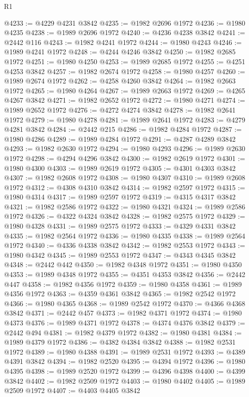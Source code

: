 \begin{lexlean}{R1}
\begin{coremodule}
@4233 := @4229 @4231 @3842
@4235 := @1982 @2696 @1972
@4236 := @1980 @4235
@4238 := @1989 @2696 @1972
@4240 := @4236 @4238 @3842
@4241 := @2442 @116
@4243 := @1982 @4241 @1972
@4244 := @1980 @4243
@4246 := @1989 @4241 @1972
@4248 := @4244 @4246 @3842
@4250 := @1982 @2685 @1972
@4251 := @1980 @4250
@4253 := @1989 @2685 @1972
@4255 := @4251 @4253 @3842
@4257 := @1982 @2674 @1972
@4258 := @1980 @4257
@4260 := @1989 @2674 @1972
@4262 := @4258 @4260 @3842
@4264 := @1982 @2663 @1972
@4265 := @1980 @4264
@4267 := @1989 @2663 @1972
@4269 := @4265 @4267 @3842
@4271 := @1982 @2652 @1972
@4272 := @1980 @4271
@4274 := @1989 @2652 @1972
@4276 := @4272 @4274 @3842
@4278 := @1982 @2641 @1972
@4279 := @1980 @4278
@4281 := @1989 @2641 @1972
@4283 := @4279 @4281 @3842
@4284 := @2442 @215
@4286 := @1982 @4284 @1972
@4287 := @1980 @4286
@4289 := @1989 @4284 @1972
@4291 := @4287 @4289 @3842
@4293 := @1982 @2630 @1972
@4294 := @1980 @4293
@4296 := @1989 @2630 @1972
@4298 := @4294 @4296 @3842
@4300 := @1982 @2619 @1972
@4301 := @1980 @4300
@4303 := @1989 @2619 @1972
@4305 := @4301 @4303 @3842
@4307 := @1982 @2608 @1972
@4308 := @1980 @4307
@4310 := @1989 @2608 @1972
@4312 := @4308 @4310 @3842
@4314 := @1982 @2597 @1972
@4315 := @1980 @4314
@4317 := @1989 @2597 @1972
@4319 := @4315 @4317 @3842
@4321 := @1982 @2586 @1972
@4322 := @1980 @4321
@4324 := @1989 @2586 @1972
@4326 := @4322 @4324 @3842
@4328 := @1982 @2575 @1972
@4329 := @1980 @4328
@4331 := @1989 @2575 @1972
@4333 := @4329 @4331 @3842
@4335 := @1982 @2564 @1972
@4336 := @1980 @4335
@4338 := @1989 @2564 @1972
@4340 := @4336 @4338 @3842
@4342 := @1982 @2553 @1972
@4343 := @1980 @4342
@4345 := @1989 @2553 @1972
@4347 := @4343 @4345 @3842
@4348 := @2442 @442
@4350 := @1982 @4348 @1972
@4351 := @1980 @4350
@4353 := @1989 @4348 @1972
@4355 := @4351 @4353 @3842
@4356 := @2442 @447
@4358 := @1982 @4356 @1972
@4359 := @1980 @4358
@4361 := @1989 @4356 @1972
@4363 := @4359 @4361 @3842
@4365 := @1982 @2542 @1972
@4366 := @1980 @4365
@4368 := @1989 @2542 @1972
@4370 := @4366 @4368 @3842
@4371 := @2442 @457
@4373 := @1982 @4371 @1972
@4374 := @1980 @4373
@4376 := @1989 @4371 @1972
@4378 := @4374 @4376 @3842
@4379 := @2442 @494
@4381 := @1982 @4379 @1972
@4382 := @1980 @4381
@4384 := @1989 @4379 @1972
@4386 := @4382 @4384 @3842
@4388 := @1982 @2531 @1972
@4389 := @1980 @4388
@4391 := @1989 @2531 @1972
@4393 := @4389 @4391 @3842
@4394 := @1982 @2520
@4395 := @4394 @1972
@4396 := @1980 @4395
@4398 := @1989 @2520 @1972
@4399 := @4396 @4398
@4400 := @4399 @3842
@4402 := @1982 @2509 @1972
@4403 := @1980 @4402
@4405 := @1989 @2509 @1972
@4407 := @4403 @4405 @3842

\end{coremodule}
\end{lexlean}

